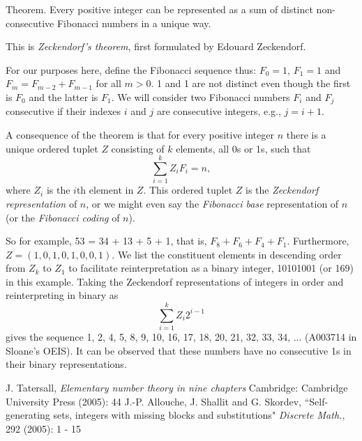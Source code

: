 \documentclass[12pt]{article}
\begin{document}

Theorem. Every positive integer can be represented as a sum of distinct non-consecutive Fibonacci numbers in a unique way.

This is {\em Zeckendorf's theorem}, first formulated by Edouard Zeckendorf.

For our purposes here, define the Fibonacci sequence thus: $F_0 = 1$, $F_1 = 1$ and $F_m = F_{m - 2} + F_{m - 1}$ for all $m > 0$. 1 and 1 are not distinct even though the first is $F_0$ and the latter is $F_1$. We will consider two Fibonacci numbers $F_i$ and $F_j$ consecutive if their indexes $i$ and $j$ are consecutive integers, e.g., $j = i + 1$.

A consequence of the theorem is that for every positive integer $n$ there is a unique ordered tuplet $Z$ consisting of $k$ elements, all 0s or 1s, such that $$\sum_{i = 1}^k Z_iF_i = n,$$ where $Z_i$ is the $i$th element in $Z$. This ordered tuplet $Z$ is the {\em Zeckendorf representation} of $n$, or we might even say the {\em Fibonacci base} representation of $n$ (or the {\em Fibonacci coding} of $n$).

So for example, 53 = 34 + 13 + 5 + 1, that is, $F_8 + F_6 + F_4 + F_1$. Furthermore, $Z = (1, 0, 1, 0, 1, 0, 0, 1)$. We list the constituent elements in descending order from $Z_k$ to $Z_1$ to facilitate reinterpretation as a binary integer, 10101001 (or 169) in this example.  Taking the Zeckendorf representations of integers in order and reinterpreting in binary as $$\sum_{i = 1}^k Z_i2^{i - 1}$$ gives the sequence 1, 2, 4, 5, 8, 9, 10, 16, 17, 18, 20, 21, 32, 33, 34, ... (A003714 in Sloane's OEIS). It can be observed that these numbers have no consecutive 1s in their binary representations.

\begin{thebibliography}{6}
 J. Tatersall, {\it Elementary number theory in nine chapters} Cambridge: Cambridge University Press (2005): 44
 J.-P. Allouche, J. Shallit and G. Skordev, ``Self-generating sets, integers with missing blocks and substitutions" {\it Discrete Math.}, 292 (2005): 1 - 15
\end{thebibliography}
\end{document}
